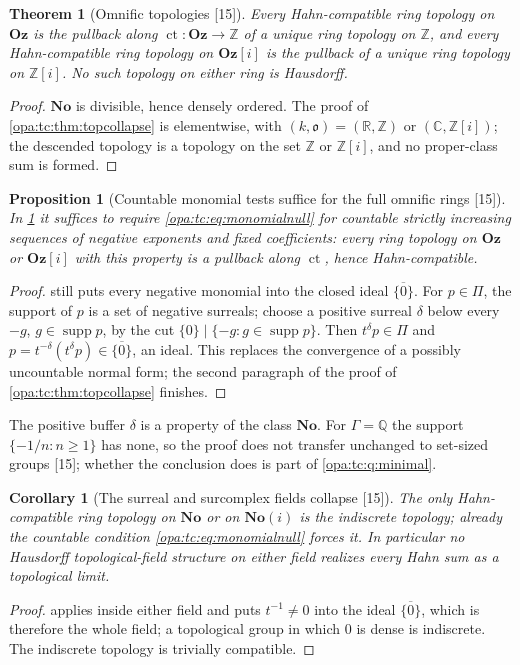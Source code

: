 \documentclass[11pt,oneside]{article}
\numberwithin{equation}{section}
\newtheorem{theorem}{Theorem}[section]
\newtheorem{proposition}[proposition]{Proposition}
\newtheorem{corollary}[corollary]{Corollary}
\theoremstyle{definition}
\theoremstyle{remark}
\newcommand{\No}{\mathbf{No}}
\newcommand{\Oz}{\mathbf{Oz}}
\newcommand{\Og}{\mathbf{Oz}[i]}
\newcommand{\SC}{\mathbf{No}(i)}
\newcommand{\R}{\mathbb R}
\newcommand{\C}{\mathbb C}
\newcommand{\Q}{\mathbb Q}
\newcommand{\Z}{\mathbb Z}
\newcommand{\oo}{\mathfrak o}
\newcommand{\supp}{\operatorname{supp}}
\newcommand{\ct}{\operatorname{ct}}
\newcommand{\src}[1]{\textup{\textsf{\small[#1]}}}
\begin{document}
\begin{theorem}[Omnific topologies \src{15}]\label{opa:tc:thm:oztopology}
Every Hahn-compatible ring topology on $\Oz$ is the pullback along $\ct:\Oz\to\Z$ of a unique ring
topology on $\Z$, and every Hahn-compatible ring topology on $\Og$ is the pullback of a unique ring
topology on $\Z[i]$. No such topology on either ring is Hausdorff.
\end{theorem}
\begin{proof}
$\No$ is divisible, hence densely ordered. The proof of \cref{opa:tc:thm:topcollapse} is elementwise,
with $(k,\oo)=(\R,\Z)$ or $(\C,\Z[i])$; the descended topology is a topology on the set $\Z$ or $\Z[i]$,
and no proper-class sum is formed.
\end{proof}

\begin{proposition}[Countable monomial tests suffice for the full omnific rings \src{15}]\label{opa:tc:prop:countablecollapse}
In \cref{opa:tc:thm:oztopology} it suffices to require \eqref{opa:tc:eq:monomialnull} for countable
strictly increasing sequences of negative exponents and fixed coefficients: every ring topology on
$\Oz$ or $\Og$ with this property is a pullback along $\ct$, hence Hahn-compatible.
\end{proposition}
\begin{proof}
 still puts every negative monomial into the closed ideal
$\overline{\{0\}}$. For $p\in\Pi$, the support of $p$ is a set of negative surreals; choose a positive
surreal $\delta$ below every $-g$, $g\in\supp p$, by the cut $\{0\}\mid\{-g:g\in\supp p\}$. Then
$t^\delta p\in\Pi$ and $p=t^{-\delta}(t^\delta p)\in\overline{\{0\}}$, an ideal. This replaces the convergence of
a possibly uncountable normal form; the second paragraph of the proof of
\cref{opa:tc:thm:topcollapse} finishes.
\end{proof}

The positive buffer $\delta$ is a property of the class $\No$. For $\Gamma=\Q$ the support
$\{-1/n:n\ge1\}$ has none, so the proof does not transfer unchanged to set-sized groups \src{15}; whether
the conclusion does is part of \cref{opa:tc:q:minimal}.

\begin{corollary}[The surreal and surcomplex fields collapse \src{15}]\label{opa:tc:cor:fieldcollapse}
The only Hahn-compatible ring topology on $\No$ or on $\SC$ is the indiscrete topology; already the
countable condition \eqref{opa:tc:eq:monomialnull} forces it. In particular no Hausdorff
topological-field structure on either field realizes every Hahn sum as a topological limit.
\end{corollary}
\begin{proof}
 applies inside either field and puts $t^{-1}\ne0$ into the ideal
$\overline{\{0\}}$, which is therefore the whole field; a topological group in which $0$ is dense is
indiscrete. The indiscrete topology is trivially compatible.
\end{proof}
\end{document}
